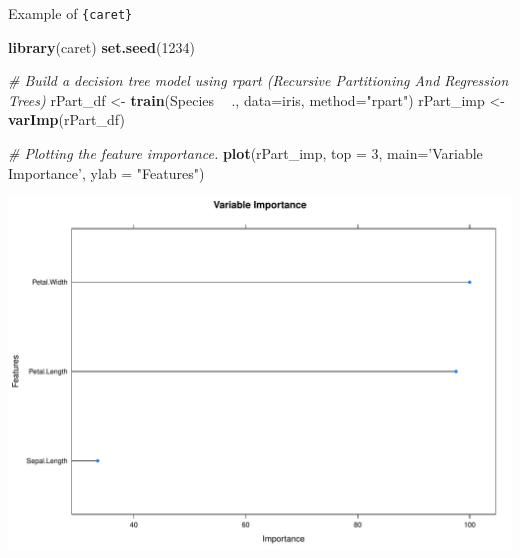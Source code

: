 \documentclass[12pt,ignorenonframetext,]{beamer}
\newenvironment{Shaded}{\begin{snugshade}}{\end{snugshade}}
\newcommand{\CommentTok}[1]{\textcolor[rgb]{0.56,0.35,0.01}{\textit{#1}}}
\newcommand{\DataTypeTok}[1]{\textcolor[rgb]{0.13,0.29,0.53}{#1}}
\newcommand{\DecValTok}[1]{\textcolor[rgb]{0.00,0.00,0.81}{#1}}
\newcommand{\KeywordTok}[1]{\textcolor[rgb]{0.13,0.29,0.53}{\textbf{#1}}}
\newcommand{\NormalTok}[1]{#1}
\newcommand{\OperatorTok}[1]{\textcolor[rgb]{0.81,0.36,0.00}{\textbf{#1}}}
\newcommand{\StringTok}[1]{\textcolor[rgb]{0.31,0.60,0.02}{#1}}
\begin{document}
\begin{frame}[fragile]{Example of \texttt{\{caret\}}}
\protect\hypertarget{example-of-2}{}

\tiny

\begin{Shaded}
\begin{Highlighting}[]
\KeywordTok{library}\NormalTok{(caret)}
\KeywordTok{set.seed}\NormalTok{(}\DecValTok{1234}\NormalTok{)}

\CommentTok{# Build a decision tree model using rpart (Recursive Partitioning And Regression Trees)}
\NormalTok{rPart_df <-}\StringTok{ }\KeywordTok{train}\NormalTok{(Species }\OperatorTok{~}\StringTok{ }\NormalTok{., }\DataTypeTok{data=}\NormalTok{iris, }\DataTypeTok{method=}\StringTok{"rpart"}\NormalTok{)}
\NormalTok{rPart_imp <-}\StringTok{ }\KeywordTok{varImp}\NormalTok{(rPart_df)}

\CommentTok{# Plotting the feature importance.}
\KeywordTok{plot}\NormalTok{(rPart_imp, }\DataTypeTok{top =} \DecValTok{3}\NormalTok{, }\DataTypeTok{main=}\StringTok{'Variable Importance'}\NormalTok{, }\DataTypeTok{ylab =} \StringTok{"Features"}\NormalTok{)}
\end{Highlighting}
\end{Shaded}

\begin{center}\includegraphics[width=0.7\linewidth,height=0.6\textheight]{figs/unnamed-chunk-4} \end{center}

\normalsize

\end{frame}
\end{document}
